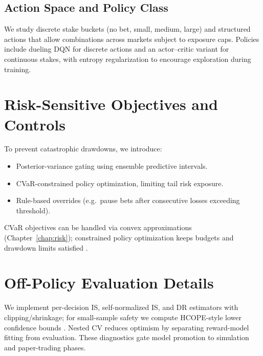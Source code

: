 
\subsection{Action Space and Policy Class}
We study discrete stake buckets (no bet, small, medium, large) and structured actions that allow combinations across markets subject to exposure caps. Policies include dueling DQN for discrete actions and an actor--critic variant for continuous stakes, with entropy regularization to encourage exploration during training.

\section{Risk-Sensitive Objectives and Controls}
To prevent catastrophic drawdowns, we introduce:
\begin{itemize}
  \item Posterior-variance gating using ensemble predictive intervals.
  \item CVaR-constrained policy optimization, limiting tail risk exposure.
  \item Rule-based overrides (e.g.\ pause bets after consecutive losses exceeding threshold).
\end{itemize}
CVaR objectives can be handled via convex approximations (Chapter~\ref{chap:risk}); constrained policy optimization keeps budgets and drawdown limits satisfied \citep{achiam2017cpo,tamar2015cvar}.

\section{Off-Policy Evaluation Details}
We implement per-decision IS, self-normalized IS, and DR estimators with clipping/shrinkage; for small-sample safety we compute HCOPE-style lower confidence bounds \citep{thomas2015}. Nested CV reduces optimism by separating reward-model fitting from evaluation. These diagnostics gate model promotion to simulation and paper-trading phases.

